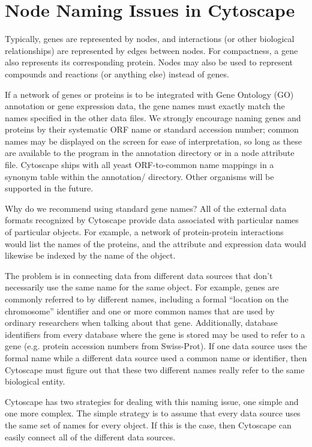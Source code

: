 \section{Node Naming Issues in Cytoscape}

 Typically, genes are represented by nodes, and interactions (or other biological relationships) are represented by edges between nodes. For compactness, a gene also represents its corresponding protein. Nodes may also be used to represent compounds and reactions (or anything else) instead of genes. 

 If a network of genes or proteins is to be integrated with Gene Ontology (GO) annotation or gene expression data, the gene names must exactly match the names specified in the other data files. We strongly encourage naming genes and proteins by their systematic ORF name or standard accession number; common names may be displayed on the screen for ease of interpretation, so long as these are available to the program in the annotation directory or in a node attribute file. Cytoscape ships with all yeast ORF-to-common name mappings in a synonym table within the annotation/ directory. Other organisms will be supported in the future. 

 Why do we recommend using standard gene names? All of the external data formats recognized by Cytoscape provide data associated with particular names of particular objects. For example, a network of protein-protein interactions would list the names of the proteins, and the attribute and expression data would likewise be indexed by the name of the object. 

 The problem is in connecting data from different data sources that don't necessarily use the same name for the same object. For example, genes are commonly referred to by different names, including a formal ``location on the chromosome'' identifier and one or more common names that are used by ordinary researchers when talking about that gene. Additionally, database identifiers from every database where the gene is stored may be used to refer to a gene (e.g. protein accession numbers from Swiss-Prot). If one data source uses the formal name while a different data source used a common name or identifier, then Cytoscape must figure out that these two different names really refer to the same biological entity. 

 Cytoscape has two strategies for dealing with this naming issue, one simple and one more complex. The simple strategy is to assume that every data source uses the same set of names for every object. If this is the case, then Cytoscape can easily connect all of the different data sources. 


